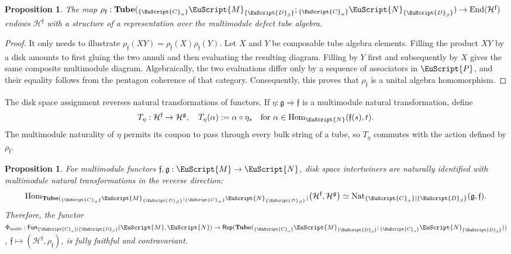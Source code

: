 \documentclass[a4paper,11pt]{article}
\newtheorem{proposition}[theorem]{Proposition}
\theoremstyle{definition}
\theoremstyle{remark}
\newcommand\eC           {\EuScript{C}}
\newcommand\eD           {\EuScript{D}}
\newcommand\eM          {\EuScript{M}}
\newcommand\eN         {\EuScript{N}}
\newcommand\eP         {\EuScript{P}}
\newcommand{\Rep}{\mathsf{Rep}}
\newcommand{\Hom}{\operatorname{Hom}}
\newcommand{\End}{\operatorname{End}}
\newcommand{\Fun}{\mathsf{Fun}}
\begin{document}
\begin{proposition}
    The map $\rho_\mathfrak{f}:\mathbf{Tube}({_{\{\eC_{\alpha}\}}} \eM_{\{\eD_{\beta}\}};{_{\{\eC_{\alpha}\}}} \eN_{\{\eD_{\beta}\}}) \to \End(\mathcal{H}^\mathfrak{f})$ endows $\mathcal{H}^\mathfrak{f}$ with a structure of a representation over the multimodule defect tube algebra. 
\end{proposition}

\begin{proof}
    It only needs to illustrate $\rho_{\mathfrak f}(XY)= \rho_{\mathfrak f}(X)\rho_{\mathfrak f}(Y)$.  Let $X$ and $Y$ be composable tube algebra elements.  Filling the product $XY$ by a disk amounts to first gluing the two annuli and then evaluating the resulting diagram.  Filling by $Y$ first and subsequently by $X$ gives the same composite multimodule diagram. Algebraically, the two evaluations differ only by a sequence of associators in $\eP$, and their equality follows from the pentagon coherence of that category. Consequently, this proves that $\rho_{\mathfrak f}$ is a unital algebra homomorphism.
\end{proof}

The disk space assignment reverses natural transformations of functors.  If $\eta:\mathfrak g\Rightarrow\mathfrak f$ is a multimodule natural transformation, define
\begin{equation*}
    T_{\eta}: \mathcal H^{\mathfrak f}\to\mathcal H^{\mathfrak g},
    \quad T_{\eta}(\alpha) := \alpha\circ\eta_s \quad \text{for } \alpha\in\Hom_{\eN}(\mathfrak f(s),t).
\end{equation*}
The multimodule naturality of $\eta$ permits its coupon to pass
through every bulk string of a tube, so $T_{\eta}$ commutes with the
action defined by $\rho_\mathfrak{f}$.

\begin{proposition}
    \label{prop:Hom-Nat-MMDW}
    For multimodule functors $\mathfrak f,\mathfrak g:\eM\to\eN$,
    disk space intertwiners are naturally identified with
    multimodule natural transformations in the reverse direction:
    \begin{equation}
        \Hom_{\mathbf{Tube}({_{\{\eC_{\alpha}\}}} \eM_{\{\eD_{\beta}\}};{_{\{\eC_{\alpha}\}}} \eN_{\{\eD_{\beta}\}})}
        \bigl(\mathcal H^{\mathfrak f},\mathcal H^{\mathfrak g}
        \bigr) \simeq\operatorname{Nat}_{\{\eC_\alpha\}|\{\eD_\beta\}} (\mathfrak g,\mathfrak f).
        \label{eq:Hom-Nat-MMDW}
    \end{equation}
    Therefore, the functor $\Phi_{\mathrm{multi}}: \Fun_{\{\eC_\alpha\}|\{\eD_\beta\}}(\eM,\eN) \to \Rep(\mathbf{Tube}({_{\{\eC_{\alpha}\}}} \eM_{\{\eD_{\beta}\}};{_{\{\eC_{\alpha}\}}} \eN_{\{\eD_{\beta}\}}))$, $\mathfrak{f} \mapsto (\mathcal{H}^{\mathfrak{f}},\rho_\mathfrak{f})$, is fully faithful and contravariant.
\end{proposition}
\end{document}
